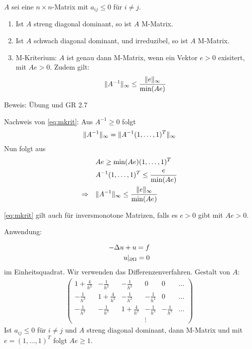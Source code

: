 \begin{satz}
\renewcommand{\labelenumi}{(\roman{enumi})}
  $A$ sei eine $n \times n$-Matrix mit $a_{ij} \leq 0$ für $i \neq j$.
  \begin{enumerate}
  \item Ist $A$ streng  diagonal dominant, so ist $A$ M-Matrix.
  \item Ist $A$ schwach diagonal dominant, und irreduzibel, so ist $A$ M-Matrix.
\item M-Kriterium: $A$ ist genau dann M-Matrix, wenn ein Vektor $e > 0$ exisitert, mit $Ae > 0$. Zudem gilt: 
  \begin{align}\label{eq:mkrit}
    \|A^{-1}\|_\infty \leq \frac{\|e\| _\infty}{\min(Ae)}
  \end{align}
  \end{enumerate}

Beweis: Übung und GR 2.7
\end{satz}
Nachweis von \eqref{eq:mkrit}: Aus $A^{-1} \geq 0$ folgt 
\begin{align*}
  \|A^{-1}\|_\infty = \|A^{-1}(1, \dots, 1)^T\|_\infty
\end{align*}
Nun folgt aus 
\begin{align*}
& Ae \geq \min(Ae) (1, \dots, 1)^T\\
&A^{-1} (1, \dots, 1)^T \leq \frac e {\min (Ae)}\\
\Rightarrow  \quad&\|A^{-1}\|_\infty \leq \frac{\|e\| _\infty}{\min(Ae)}
\end{align*}

\eqref{eq:mkrit} gilt auch für inversmonotone Matrizen, falls es $e > 0$ gibt mit $Ae > 0$.

\begin{beispiel} Anwendung:

  \begin{align*}
    - \Delta u + u = f\\
u|_{\partial \Omega} = 0
  \end{align*}
im Einheitsquadrat. Wir verwenden das Differenzenverfahren. Gestalt von $A$:  
\begin{align*}
  \begin{pmatrix}
    1 + \frac 4 {h^2} & - \frac 1 {h^2} & - \frac 1 {h^2} & 0 & 0 & \dots \\
- \frac 1 {h^2} & 1 + \frac 4 {h^2} & - \frac 1 {h^2} & - \frac 1 {h^2} & 0 &  \dots \\
- \frac 1 {h^2} &- \frac 1 {h^2} & 1 + \frac 4 {h^2} & - \frac 1 {h^2} & - \frac 1 {h^2}  &  \dots \\
 & & & \vdots
  \end{pmatrix}
\end{align*}
Ist $a_{ij} \leq 0$ für $i \neq j$ und $A$ streng diagonal dominant, dann M-Matrix und mit $e = (1, \dots, 1)^T$ folgt $Ae \geq 1$.
\end{beispiel}

